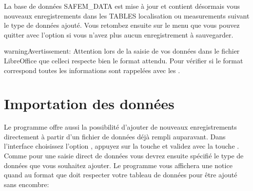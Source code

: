 \documentclass[letterpaper,10pt,french]{sphinxmanual}
\begin{document}
\begin{sphinxVerbatim}[commandchars=\\\{\}]
   
\end{sphinxVerbatim}

\sphinxAtStartPar
La base de données SAFEM\_DATA est mise à jour et contient désormais vous nouveaux enregistrements dans les TABLES localisation ou measurements suivant le type de données ajouté.
Vous retombez ensuite sur le menu  que vous pouvez quitter avec l’option 
si vous n’avez plus aucun enregistrement à sauvegarder.

\begin{sphinxadmonition}{warning}{Avertissement:}
\sphinxAtStartPar
Attention lors de la saisie de vos données dans le fichier LibreOffice que celle\sphinxhyphen{}ci respecte bien le format attendu.
Pour vérifier si le format correspond toutes les informations sont rappelées avec les {\hyperref[\detokenize{bones:skeleton}]{}}.
\end{sphinxadmonition}


\section{Importation des données}
\label{\detokenize{adddata:importation-des-donnees}}\label{\detokenize{adddata:import}}
\sphinxAtStartPar
Le programme offre aussi la possibilité d’ajouter de nouveaux enregistrements directement à partir d’un fichier de données
 déjà rempli auparavant. Dans l’interface  choisissez l’option
, appuyez sur la touche  et validez avec la touche .
Comme pour une saisie direct de données vous devrez ensuite spécifié le type de données que vous souhaitez ajouter.
Le programme vous affichera une notice quand au format que doit respecter votre tableau de données pour être ajouté sans encombre:
\end{document}
